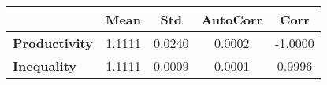 \begin{tiny}\begin{tabular}{|l|c|c|c|c|}
\hline
&\textbf{Mean}&\textbf{Std}&\textbf{AutoCorr}&\textbf{Corr}\\\hline
\textbf{Productivity}&1.1111&0.0240&0.0002&-1.0000\\\hline
\textbf{Inequality}&1.1111&0.0009&0.0001&0.9996\\\hline
\end{tabular}
\end{tiny}